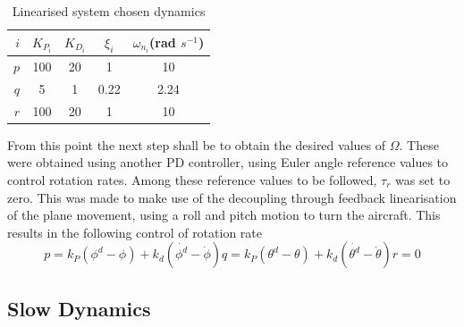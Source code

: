 \begin{table}[htbp]
  \centering
  \caption[Linearised system chosen dynamics]{Linearised system chosen dynamics}
    \begin{tabular}{rcccc}
    \toprule
    $i$   & $K_{P_i}$ & $K_{D_i}$ & $\xi_i$ & $\omega_{n_i}$(rad $s^{-1}$) \\
    \midrule
    $p$   & 100   & 20    & 1     & 10 \\
    $q$   & 5     & 1     & 0.22 & 2.24 \\
    $r$   & 100   & 20    & 1     & 10 \\
    \bottomrule
    \end{tabular}%
  \label{tab:tau_dynamics}%
\end{table}%


From this point the next step shall be to obtain the desired values of $\Omega$. These were obtained using another PD controller, using Euler angle reference values to control rotation rates. Among these reference values to be followed, $\tau_r$ was set to zero. This was made to make use of the decoupling through feedback linearisation of the plane movement, using a roll and pitch motion to turn the aircraft. This results in the following control of rotation rate
\begin{subequations}
\begin{equation}
p= k_P (\phi^d-\phi) + k_d (\dot{\phi^d}-\dot{\phi})
\end{equation}
\begin{equation}
q= k_P (\theta^d-\theta) + k_d (\dot{\theta^d}-\dot{\theta})
\end{equation}
\begin{equation}
r=0
\end{equation}
\label{eq:omega_PD}
\end{subequations}

\subsection{Slow Dynamics}

